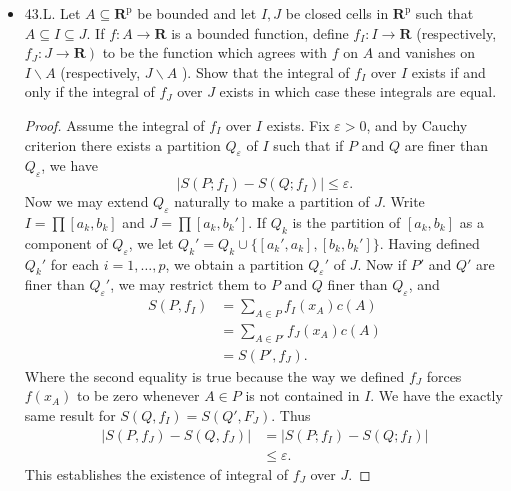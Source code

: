 \begin{itemize}
\begin{proof}
	Now we take a partition $P_\varepsilon$ of $J$ fine enough such that for any cell $A \in P_\varepsilon$, we have $\text{diam} A < \delta$. This implies $\left| g(x,y) - g(x', y') \right| <\varepsilon$ for $(x,y)$ and $(x', y')$ in the same cell $A$. Now we define the following cover of $\text{graph of }g$ :
	\[
		Q_\varepsilon = \{A \times \left[ f(x_A)-\varepsilon, f(x_A)+ \varepsilon \right] \subset \mathbb{R}^3: A \in P_\varepsilon \} 
	.\] 
	where $x_A \in A$ is chosen arbitrarily for each $A \in P_\varepsilon$.
	Now the total content of $Q_\varepsilon$ is
	\[
		c(Q_\varepsilon) = \sum_{A \in P_\varepsilon} |A| \times 2\varepsilon = 2 \varepsilon |J|
	.\] 
	Since $|J|$ is fixed and $\varepsilon$ is arbitrary, the graph of $g$ has measure zero.
\end{proof}

\newpage
\item 43.L. Let $A \subseteq \boldsymbol{R}^{\mathrm{p}}$ be bounded and let $I, J$ be closed cells in $\boldsymbol{R}^{\mathrm{p}}$ such that $A \subseteq I \subseteq J$. If $f: A \rightarrow \boldsymbol{R}$ is a bounded function, define $f_I: I \rightarrow \boldsymbol{R}$ (respectively, $\left.f_J: J \rightarrow \boldsymbol{R}\right)$ to be the function which agrees with $f$ on $A$ and vanishes on $I \backslash A$ (respectively, $J \backslash A$ ). Show that the integral of $f_I$ over $I$ exists if and only if the integral of $f_J$ over $J$ exists in which case these integrals are equal.
\begin{proof}
	 Assume  the integral of $f_I$ over $I$ exists. Fix $\varepsilon>0$, and by Cauchy criterion there exists a partition $Q_\varepsilon$ of $I$ such that if $P$ and $Q$ are finer than $Q_\varepsilon$, we have 
	 \[
	 	\left| S(P;f_I) - S(Q;f_I) \right| \le \varepsilon
	 .\] 
	 Now we may extend $Q_\varepsilon$ naturally to make a partition of $J$. Write $I = \prod [a_k, b_k]$ and $J = \prod [a_k, b_k']$. If $Q_k$ is the partition of $[a_k, b_k]$ as a component of $Q_\varepsilon$, we let $Q_k' = Q_k \cup \{[a_k', a_k], [b_k, b_k']\}$. Having defined $Q_k'$ for each $i = 1,\ldots, p$, we obtain a partition $Q_\varepsilon'$ of $J$. Now if $P'$ and $Q'$ are finer than $Q_\varepsilon'$, we may restrict them to $P$ and $Q$ finer than $Q_\varepsilon$, and 
	\begin{align*}
	 	 S(P, f_I) 
		&= \sum_{A \in P}f_I(x_A) c(A)  \\
		&= \sum_{A \in P'}f_J(x_A) c(A) \\
		&= S(P', f_J) 
	 .\end{align*} 
	 Where the second equality is true because the way we defined $f_J$ forces $f(x_A)$ to be zero whenever $A \in P $ is not contained in $I$. 
	 We have the exactly same result for $S(Q, f_I) = S(Q', F_J)$.
	 Thus
	 \begin{align*}
	 	\left| S(P, f_J) - S(Q, f_J) \right| 
		&= \left| S(P;f_I) - S(Q ;f_I) \right| \\
		&\le \varepsilon
	 .\end{align*} 
	 This establishes the existence of integral of $f_J$ over $J$.
	 

\end{proof}
\end{itemize}

